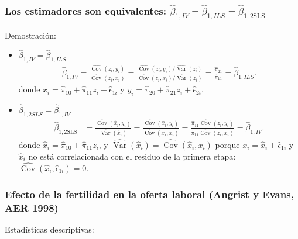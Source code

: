 \documentclass[t, compress, spanish, aspectratio=169]{beamer}
\DeclareMathOperator{\Var}{Var}
\DeclareMathOperator{\Cov}{Cov}
\begin{document}
	\begin{frame}
		\frametitle{Los estimadores son equivalentes: $\hat \beta_{1,IV}=\hat \beta_{1,ILS}=\hat \beta_{1,\text{2SLS}}$}
        	Demostraci\'on:
		\begin{itemize}
            		\item $\hat \beta_{1,IV}=\hat \beta_{1,ILS}$
			\begin{align*}
				\hat \beta_{1,IV} =\frac{\widehat{\Cov}(z_i,y_i)}{\widehat{\Cov}(z_i,x_i)}=\frac{\widehat{\Cov}(z_i,y_i)/\widehat{\Var}( z_i)}{\widehat{\Cov}(z_i,x_i)/\widehat{\Var}( z_i)}=\frac{\hat\pi_{21}}{\hat \pi_{11}}=\hat \beta_{1,ILS}.
			\end{align*}
			donde $x_i=\hat \pi_{10}+\hat \pi_{11}z_i+\hat \epsilon_{1i}$ y $y_i=\hat \pi_{20}+\hat \pi_{21}z_i+\hat \epsilon_{2i}$.
			\item  $\hat \beta_{1,2SLS}=\hat \beta_{1,IV}$
			\begin{align*}
				\hat \beta_{1, \text{2SLS}}&=\frac{\widehat{\Cov}(\hat x_i,y_i)}{\widehat{\Var}(\hat x_i)}
				=\frac{\widehat{\Cov}(\hat x_i,y_i)}{\widehat{\Cov}(\hat x_i,x_i)}
				=\frac{\hat\pi_{11}\widehat{\Cov}(z_i,y_i)}{\hat\pi_{11}\widehat{\Cov}(z_i,x_i)}=\hat \beta_{1,IV}.
			\end{align*}
			donde $\hat x_i=\hat \pi_{10}+\hat\pi_{11}z_i$, y $\widehat{\Var}(\hat x_i)=\widehat{\Cov}(\hat x_i,x_i)$ porque $x_i=\hat x_i+\hat\epsilon_{1i}$ y $\hat x_i$ no est\'a correlacionada con el residuo de la primera etapa: $\widehat{\Cov}(\hat x_i,\hat \epsilon_{1i})=0$.
		\end{itemize}
	\end{frame}
\begin{frame}
	\frametitle{Efecto de la fertilidad en la oferta laboral (Angrist y Evans, AER 1998)}
	Estad\'isticas descriptivas:
	\begin{center}
	\small
	
	\end{center}
\end{frame}
\end{document}
